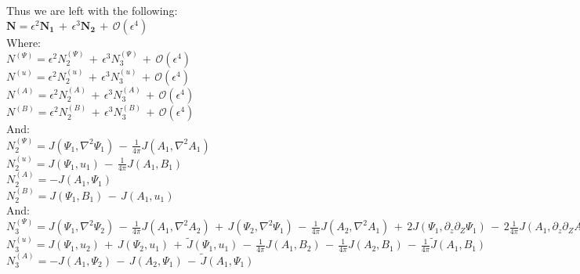 \documentclass[letterpaper,12pt]{article}
\begin{document}
Thus we are left with the following: \\

$\mathbf{N} = \epsilon^2\mathbf{N_1} \, + \, \epsilon^3\mathbf{N_2} \, + \, \mathcal{O}(\epsilon^4)$ \\

Where: \\

\noindent $N^{(\Psi)} = \epsilon^2 N_2^{(\Psi)} \, + \, \epsilon^3 N_3^{(\Psi)} \, + \, \mathcal{O}(\epsilon^4)$ \\
$N^{(u)} = \epsilon^2 N_2^{(u)} \, + \, \epsilon^3 N_3^{(u)} \, + \, \mathcal{O}(\epsilon^4)$ \\
$N^{(A)} = \epsilon^2 N_2^{(A)} \, + \, \epsilon^3 N_3^{(A)} \, + \, \mathcal{O}(\epsilon^4)$ \\
$N^{(B)} = \epsilon^2 N_2^{(B)} \, + \, \epsilon^3 N_3^{(B)} \, + \, \mathcal{O}(\epsilon^4)$ \\

And: \\

$N_2^{(\Psi)} = J(\Psi_1, \nabla^2 \Psi_1) \,-\, \frac{1}{4\pi}J(A_1, \nabla^2 A_1) $ \\

$N_2^{(u)} = J(\Psi_1, u_1) \, - \, \frac{1}{4\pi} J(A_1, B_1) $ \\

$N_2^{(A)} = - J(A_1, \Psi_1)$ \\

$N_2^{(B)} =  J(\Psi_1, B_1) \, - \, J(A_1, u_1)$\\

And: \\

$N_3^{(\Psi)} = J(\Psi_1, \nabla^2\Psi_2) \, - \, \frac{1}{4\pi}J(A_1, \nabla^2 A_2) \,+\, J(\Psi_2, \nabla^2\Psi_1) \, - \, \frac{1}{4\pi}J(A_2, \nabla^2 A_1) \,+\, 2 J(\Psi_1, \partial_z\partial_Z \Psi_1) \, - \, 2 \frac{1}{4\pi}J(A_1, \partial_z\partial_Z A_1) \,+\, \widetilde{J}(\Psi_1, \nabla^2 \Psi_1) \, - \,  \frac{1}{4\pi}\widetilde{J}(A_1, \nabla^2 A_1) $ \\

$N_3^{(u)} = J(\Psi_1, u_2) \, + \, J(\Psi_2, u_1) \, + \, \widetilde{J}(\Psi_1, u_1) \, - \, \frac{1}{4\pi} J(A_1, B_2) \, - \, \frac{1}{4\pi} J(A_2, B_1) \, - \, \frac{1}{4\pi} \widetilde{J}(A_1, B_1)$ \\

$N_3^{(A)} = - J(A_1, \Psi_2) \, - \, J(A_2, \Psi_1) \, - \, \widetilde{J}(A_1, \Psi_1) \,$ \\
\end{document}
